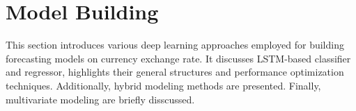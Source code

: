 \section{Model Building}
This section introduces various deep learning approaches employed for building forecasting models on currency exchange rate. It discusses LSTM-based classifier and regressor, highlights their general structures and performance optimization techniques. Additionally, hybrid modeling methods are presented. Finally, multivariate modeling are briefly disscussed.








